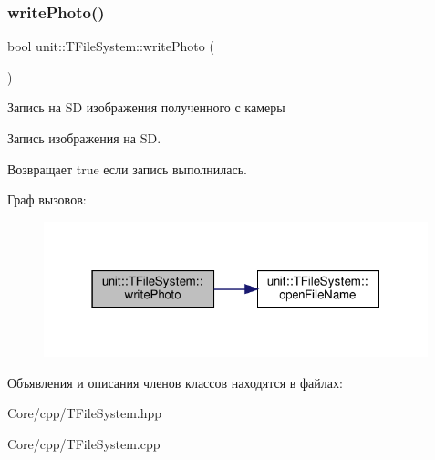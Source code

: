 \subsubsection{\texorpdfstring{write\+Photo()}{writePhoto()}}
{\footnotesize\ttfamily bool unit\+::\+T\+File\+System\+::write\+Photo (\begin{DoxyParamCaption}{ }\end{DoxyParamCaption})}



Запись на SD изображения полученного с камеры 



 Запись изображения на SD. \begin{DoxyReturn}{Возвращает}
true если запись выполнилась. 
\end{DoxyReturn}
Граф вызовов\+:\nopagebreak
\begin{figure}[H]
\begin{center}
\leavevmode
\includegraphics[width=316pt]{classunit_1_1_t_file_system_aacd7aae1827432b04c06b9a1d440b949_cgraph}
\end{center}
\end{figure}


Объявления и описания членов классов находятся в файлах\+:\begin{DoxyCompactItemize}
\item 
Core/cpp/T\+File\+System.\+hpp\item 
Core/cpp/T\+File\+System.\+cpp\end{DoxyCompactItemize}
